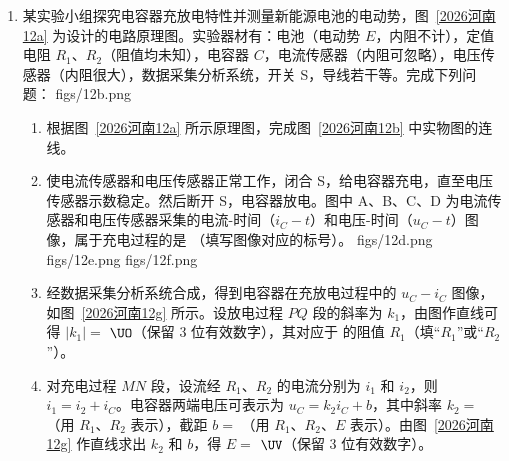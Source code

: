 \documentclass[\gkver]{gaokaozhenti}
\begin{document}
\begin{enumerate}
\item
某实验小组探究电容器充放电特性并测量新能源电池的电动势，图~\ref{2026河南12a} 为设计的电路原理图。实验器材有：电池（电动势 $E$，内阻不计），定值电阻 $R_{1}$、$R_{2}$（阻值均未知），电容器 $C$，电流传感器（内阻可忽略），电压传感器（内阻很大），数据采集分析系统，开关 S，导线若干等。完成下列问题：
{figs/12b.png}
\begin{enumerate}
	\item
	根据图~\ref{2026河南12a} 所示原理图，完成图~\ref{2026河南12b} 中实物图的连线。
	\item
	使电流传感器和电压传感器正常工作，闭合 S，给电容器充电，直至电压传感器示数稳定。然后断开 S，电容器放电。图中 A、B、C、D 为电流传感器和电压传感器采集的电流-时间（$i_{C}-t$）和电压-时间（$u_{C}-t$）图像，属于充电过程的是 （填写图像对应的标号）。
	{figs/12d.png}
	{figs/12e.png}
	{figs/12f.png}
	\item
	经数据采集分析系统合成，得到电容器在充放电过程中的 $u_{C}-i_{C}$ 图像，如图~\ref{2026河南12g} 所示。设放电过程 $PQ$ 段的斜率为 $k_{1}$，由图作直线可得 $|k_{1}|=$  $\UO$（保留 3 位有效数字），其对应于  的阻值 $R_{1}$（填“$R_{1}$”或“$R_{2}$”）。
	\item
	对充电过程 $MN$ 段，设流经 $R_{1}$、$R_{2}$ 的电流分别为 $i_{1}$ 和 $i_{2}$，则 $i_{1}=i_{2}+i_{C}$。电容器两端电压可表示为 $u_{C}=k_{2}i_{C}+b$，其中斜率 $k_{2}=$ （用 $R_{1}$、$R_{2}$ 表示），截距 $b=$ （用 $R_{1}$、$R_{2}$、$E$ 表示）。由图~\ref{2026河南12g} 作直线求出 $k_{2}$ 和 $b$，得 $E=$  $\UV$（保留 3 位有效数字）。
\end{enumerate}

\end{enumerate}
\end{document}
